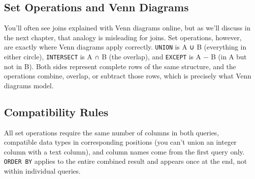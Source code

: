 \documentclass[
  letterpaper,
  DIV=11,
  numbers=noendperiod]{scrreprt}
\begin{document}
\subsection{Set Operations and Venn
Diagrams}\label{set-operations-and-venn-diagrams}

You'll often see joins explained with Venn diagrams online, but as we'll
discuss in the next chapter, that analogy is misleading for joins. Set
operations, however, are exactly where Venn diagrams apply correctly.
\texttt{UNION} is A ∪ B (everything in either circle),
\texttt{INTERSECT} is A ∩ B (the overlap), and \texttt{EXCEPT} is A − B
(in A but not in B). Both sides represent complete rows of the same
structure, and the operations combine, overlap, or subtract those rows,
which is precisely what Venn diagrams model.

\subsection{Compatibility Rules}\label{compatibility-rules}

All set operations require the same number of columns in both queries,
compatible data types in corresponding positions (you can't union an
integer column with a text column), and column names come from the first
query only. \texttt{ORDER\ BY} applies to the entire combined result and
appears once at the end, not within individual queries.
\end{document}

